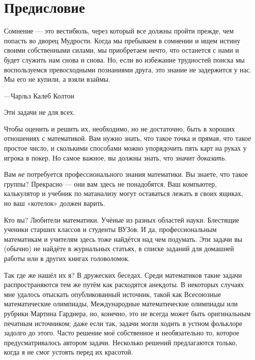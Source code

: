 \chapter*{Предисловие}

\setlength{\epigraphwidth}{.84\textwidth}
\epigraph{Сомнение --- это вестибюль, через который все должны пройти прежде, чем попасть во дворец Мудрости.
Когда мы пребываем в сомнении и ищем истину своими собственными силами, мы приобретаем нечто, что останется с нами и будет служить нам снова и снова.
Но, если во избежание трудностей поиска мы воспользуемся превосходными познаниями друга, это знание не задержится у нас.
Мы его не купили, а взяли взаймы.}{---Чарльз Калеб Колтон}
                                                                                     

Эти задачи не для всех.

Чтобы оценить и решить их, необходимо, но не достаточно, быть в хороших отношениях с математикой.
Вам нужно знать, что такое точка и прямая, что такое простое число, и сколькими способами можно упорядочить пять карт на руках у игрока в покер.
Но самое важное, вы должны знать, что значит \emph{доказать}.

Вам \emph{не} потребуется профессионального знания математики.
Вы знаете, что такое группы? Прекрасно ---  они вам здесь не понадобятся.
Ваш компьютер, калькулятор и учебник по матанализу могут оставаться лежать в своих ящиках, но ваш «котелок» должен варить.

Кто вы? Любители математики.
Учёные из разных областей науки.
Блестящие ученики старших классов и студенты ВУЗов.
И да, профессиональным математикам и учителям здесь тоже найдётся над чем подумать.
Эти задачи вы (обычно) не найдёте в журнальных статьях, в списке заданий для домашней работы или в других книгах головоломок.

Так где же нашёл их я? В дружеских беседах.
Среди математиков такие задачи распространяются тем же путём как расходятся анекдоты.
В некоторых случаях мне удалось отыскать опубликованный источник, такой как Всесоюзные математические олимпиады, Международные математические олимпиады или рубрики Мартина Гарднера, но, конечно, это не всегда может быть оригинальным печатным источником;
даже если так, задачи могли ходить в устном фольклоре задолго до этого.
Часто решение моё собственное и необязательно то, которое предусматривалось автором задачи.
Несколько решений предлагаются только, когда я не смог устоять перед их красотой.

